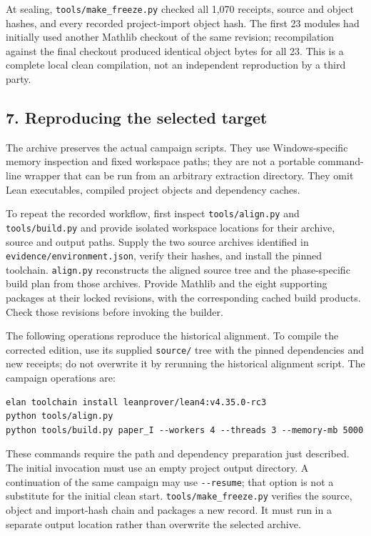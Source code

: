 \documentclass[english,11pt,a4paper]{article}
\begin{document}
At sealing, \texttt{tools/\allowbreak{}make\_\allowbreak{}freeze.\allowbreak{}py} checked all 1,070 receipts, source and object hashes, and every recorded project-import object hash. The first 23 modules had initially used another Mathlib checkout of the same revision; recompilation against the final checkout produced identical object bytes for all 23. This is a complete local clean compilation, not an independent reproduction by a third party.

\subsection{7. Reproducing the selected target}\label{reproducing-the-selected-target}

The archive preserves the actual campaign scripts. They use Windows-specific memory inspection and fixed workspace paths; they are not a portable command-line wrapper that can be run from an arbitrary extraction directory. They omit Lean executables, compiled project objects and dependency caches.

To repeat the recorded workflow, first inspect \texttt{tools/\allowbreak{}align.\allowbreak{}py} and \texttt{tools/\allowbreak{}build.\allowbreak{}py} and provide isolated workspace locations for their archive, source and output paths. Supply the two source archives identified in \texttt{evidence/\allowbreak{}environment.\allowbreak{}json}, verify their hashes, and install the pinned toolchain. \texttt{align.\allowbreak{}py} reconstructs the aligned source tree and the phase-specific build plan from those archives. Provide Mathlib and the eight supporting packages at their locked revisions, with the corresponding cached build products. Check those revisions before invoking the builder.

The following operations reproduce the historical alignment. To compile the corrected edition, use its supplied \texttt{source/\allowbreak{}} tree with the pinned dependencies and new receipts; do not overwrite it by rerunning the historical alignment script. The campaign operations are:

\begin{verbatim}
elan toolchain install leanprover/lean4:v4.35.0-rc3
python tools/align.py
python tools/build.py paper_I --workers 4 --threads 3 --memory-mb 5000
\end{verbatim}

These commands require the path and dependency preparation just described. The initial invocation must use an empty project output directory. A continuation of the same campaign may use \texttt{-\/\allowbreak{}-resume}; that option is not a substitute for the initial clean start. \texttt{tools/\allowbreak{}make\_\allowbreak{}freeze.\allowbreak{}py} verifies the source, object and import-hash chain and packages a new record. It must run in a separate output location rather than overwrite the selected archive.
\end{document}
